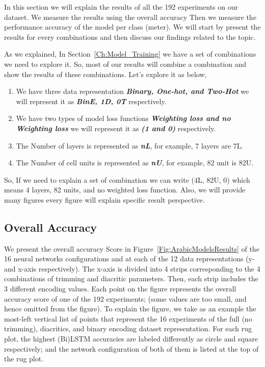 In this section we will explain the results of all the 192 experiments on our dataset. We measure the results using the overall accuracy Then we measure the performance accuracy of the model per class (meter). We will start by present the results for every combinations and then discuss our findings related to the topic.

As we explained, In Section~\ref{Ch:Model_Training} we have a set of combinations we need to explore it. So, most of our results will combine a combination and show the results of these combinations. Let's explore it as below,
\begin{enumerate}
  \item  We have three data representation \textbf{\textit{Binary, One-hot, and Two-Hot}} we will represent it as \textbf{\textit{BinE, 1D, 0T}} respectively.
  \item We have two types of model loss functions \textbf{\textit{Weighting loss and no Weighting loss}} we will represent it as \textbf{\textit{(1 and 0)}} respectively.
  \item The Number of layers is represented as \textbf{\textit{nL}}, for example, 7 layers are 7L.
  \item The Number of cell units is represented as \textbf{\textit{nU}}, for example, 82 unit is 82U.
\end{enumerate}

So, If we need to explain a set of combination we can write (4L, 82U, 0) which means 4 layers, 82 units, and no weighted loss function. Also, we will provide many figures every figure will explain specific result perspective.

\subsection{Overall Accuracy}

We present the overall accuracy Score in Figure~\ref{Fig:ArabicModelsResults} of the 16 neural networks configurations and at each of the 12 data representations (y- and x-axis respectively). The x-axis is divided into 4 strips corresponding to the 4 combinations of trimming and diacritic parameters. Then, each strip includes the 3 different encoding values. Each point on the figure represents the overall accuracy score of one of the 192 experiments; (some values are too small, and hence omitted from the figure). To explain the figure, we take as an example the most-left vertical list of points that represent the 16 experiments of the full (no trimming), diacritics, and binary encoding dataset representation. For each rug plot, the highest (Bi)LSTM accuracies are labeled differently as circle and square respectively; and the network configuration of both of them is listed at the top of the rug plot.

